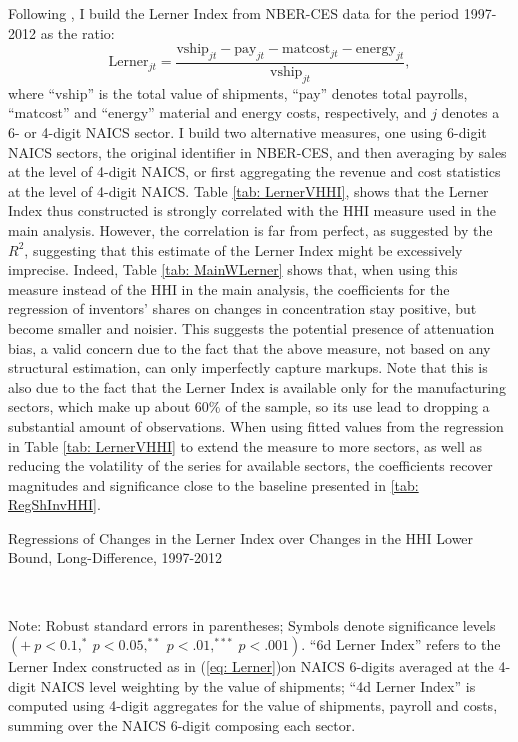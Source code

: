 Following \citet{grullonAreUSIndustries2019a}, I build the Lerner
Index from NBER-CES data for the period 1997-2012 as the ratio:
\begin{equation}
\text{Lerner}_{jt}=\frac{\text{vship}_{jt}-\text{pay}_{jt}-\text{matcost}_{jt}-\text{energy}_{jt}}{\text{vship}_{jt}},\label{eq: Lerner}
\end{equation}
where ``vship'' is the total value of shipments, ``pay'' denotes
total payrolls, ``matcost'' and ``energy'' material and energy
costs, respectively, and $j$ denotes a 6- or 4-digit NAICS sector.
I build two alternative measures, one using 6-digit NAICS sectors,
the original identifier in NBER-CES, and then averaging by sales at
the level of 4-digit NAICS, or first aggregating the revenue and cost
statistics at the level of 4-digit NAICS. Table \ref{tab: LernerVHHI},
shows that the Lerner Index thus constructed is strongly correlated
with the HHI measure used in the main analysis. However, the correlation
is far from perfect, as suggested by the $R^{2}$, suggesting that
this estimate of the Lerner Index might be excessively imprecise.
Indeed, Table \ref{tab: MainWLerner} shows that, when using this
measure instead of the HHI in the main analysis, the coefficients
for the regression of inventors' shares on changes in concentration
stay positive, but become smaller and noisier. This suggests the potential
presence of attenuation bias, a valid concern due to the fact that
the above measure, not based on any structural estimation, can only
imperfectly capture markups. Note that this is also due to the fact
that the Lerner Index is available only for the manufacturing sectors,
which make up about 60\% of the sample, so its use lead to dropping
a substantial amount of observations. When using fitted values from
the regression in Table \ref{tab: LernerVHHI} to extend the measure
to more sectors, as well as reducing the volatility of the series
for available sectors, the coefficients recover magnitudes and significance
close to the baseline presented in \ref{tab: RegShInvHHI}.

\begin{table}[h]
\caption{Regressions of Changes in the Lerner Index over Changes in the HHI
Lower Bound, Long-Difference, 1997-2012\label{tab: LernerVHHI}}

\begin{centering}
\scalebox{1}{}\\
\par\end{centering}
\raggedright{}{\small{}Note: Robust standard errors in parentheses;
Symbols denote significance levels $\left(+\ p<0.1,^{*}\ p<0.05,^{**}\ p<.01,^{***}\ p<.001\right)$.
``6d Lerner Index'' refers to the Lerner Index constructed as in
(\ref{eq: Lerner})on NAICS 6-digits averaged at the 4-digit NAICS
level weighting by the value of shipments; ``4d Lerner Index'' is
computed using 4-digit aggregates for the value of shipments, payroll
and costs, summing over the NAICS 6-digit composing each sector. }{\small\par}
\end{table}

